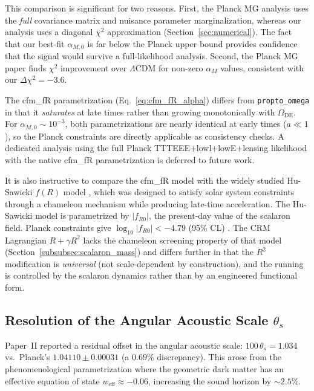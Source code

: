 \documentclass[aps,prd,twocolumn,superscriptaddress,nofootinbib]{revtex4-2}
\begin{document}
This comparison is significant for two reasons. First, the Planck MG analysis uses the \textit{full} covariance matrix and nuisance parameter marginalization, whereas our analysis uses a diagonal $\chi^2$ approximation (Section~\ref{sec:numerical}). The fact that our best-fit $\alpha_{M,0}$ is far below the Planck upper bound provides confidence that the signal would survive a full-likelihood analysis. Second, the Planck MG paper finds $\chi^2$ improvement over $\Lambda$CDM for non-zero $\alpha_M$ values, consistent with our $\Delta\chi^2 = -3.6$.

The cfm\_fR parametrization (Eq.~\ref{eq:cfm_fR_alpha}) differs from \texttt{propto\_omega} in that it \textit{saturates} at late times rather than growing monotonically with $\Omega_{\mathrm{DE}}$. For $\alpha_{M,0} \sim 10^{-3}$, both parametrizations are nearly identical at early times ($a \ll 1$), so the Planck constraints are directly applicable as consistency checks. A dedicated analysis using the full Planck TTTEEE+lowl+lowE+lensing likelihood with the native cfm\_fR parametrization is deferred to future work.

It is also instructive to compare the cfm\_fR model with the widely studied Hu-Sawicki $f(R)$ model \cite{HuSawicki2007}, which was designed to satisfy solar system constraints through a chameleon mechanism while producing late-time acceleration. The Hu-Sawicki model is parametrized by $|f_{R0}|$, the present-day value of the scalaron field. Planck constraints give $\log_{10}|f_{R0}| < -4.79$ (95\% CL) \cite{PlanckMG2016}. The CRM Lagrangian $R + \gamma R^2$ lacks the chameleon screening property of that model (Section~\ref{subsubsec:scalaron_mass}) and differs further in that the $R^2$ modification is \textit{universal} (not scale-dependent by construction), and the running is controlled by the scalaron dynamics rather than by an engineered functional form.


\subsection{Resolution of the Angular Acoustic Scale $\theta_s$}
\label{subsec:theta_s}

Paper~II reported a residual offset in the angular acoustic scale: $100\,\theta_s = 1.034$ vs.\ Planck's $1.04110 \pm 0.00031$ (a $0.69\%$ discrepancy). This arose from the phenomenological parametrization where the geometric dark matter has an effective equation of state $w_{\mathrm{eff}} \approx -0.06$, increasing the sound horizon by $\sim 2.5\%$.
\end{document}
